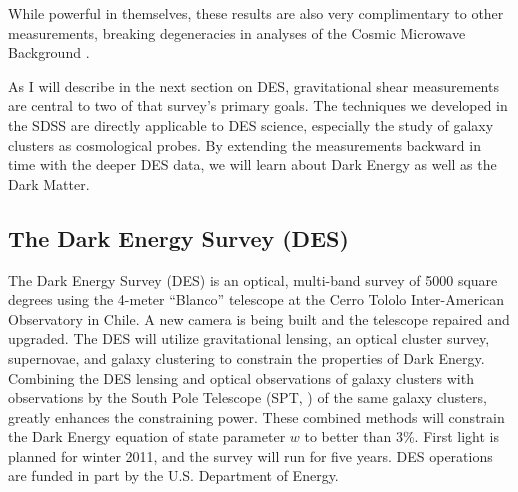 \documentclass[12pt]{article}
\begin{document}
While powerful in themselves, these results are also very complimentary to
other measurements, breaking degeneracies in analyses of the Cosmic Microwave
Background \cite{KomatsuWMAPCosmo09}. 

As I will describe in the next section on DES, gravitational shear measurements
are central to two of that survey's primary goals.  The techniques we developed
in the SDSS are directly applicable to DES science, especially the study of
galaxy clusters as cosmological probes.  By extending the measurements backward
in time with the deeper DES data, we will learn about Dark Energy as well as
the Dark Matter.

\subsection{The Dark Energy Survey (DES)}

The Dark Energy Survey (DES) is an optical, multi-band survey of 5000 square
degrees using the 4-meter ``Blanco'' telescope at the Cerro Tololo
Inter-American Observatory in Chile. A new camera is being built and the
telescope repaired and upgraded.  The DES will utilize gravitational lensing,
an optical cluster survey, supernovae, and galaxy clustering to constrain the
properties of Dark Energy.  Combining the DES lensing and optical observations
of galaxy clusters with observations by the South Pole Telescope (SPT,
\cite{SPT04}) of the same galaxy clusters, greatly enhances the constraining
power.  These combined methods will constrain the Dark Energy equation of state
parameter $w$ to better than 3\%.  First light is planned for winter 2011, and
the survey will run for five years.  DES operations are funded in part by the
U.S.  Department of Energy. 
\end{document}
